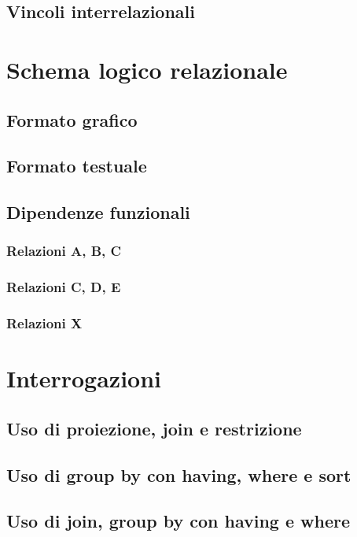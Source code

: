 \documentclass[a4paper,12pt]{article}
\begin{document}
 \subsection{ Vincoli interrelazionali }

 \section{ Schema logico relazionale }

 \subsection{ Formato grafico }

 \subsection{ Formato testuale }

 \subsection{ Dipendenze funzionali }

 \subsubsection{ Relazioni A, B, C }

 \subsubsection{ Relazioni C, D, E }

 \subsubsection{ Relazioni X }

 \section{ Interrogazioni }

 \subsection{ Uso di proiezione, join e restrizione }
 \subsection{ Uso di group by con having, where e sort }
 \subsection{ Uso di join, group by con having e where }
\end{document}
